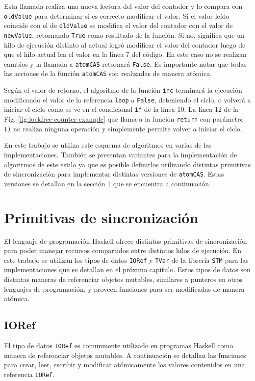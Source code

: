 Esta llamada realiza una nueva lectura del valor del contador y lo compara con \texttt{oldValue} para determinar si es correcto modificar el valor.
Si el valor leído coincide con el de \texttt{oldValue} se modifica el valor del contador con el valor de \texttt{newValue}, retornando \texttt{True} como resultado de la función.
Si no, significa que un hilo de ejecución distinto al actual logró modificar el valor del contador luego de que el hilo actual lea el valor en la línea 7 del código.
En este caso no se realizan cambios y la llamada a \texttt{atomCAS} retornará \texttt{False}.
Es importante notar que todas las acciones de la función \texttt{atomCAS} son realizadas de manera atómica.

Según el valor de retorno, el algoritmo de la función \texttt{inc} terminará la ejecución modificando el valor de la referencia \texttt{loop} a \texttt{False}, deteniendo el ciclo, o volverá a iniciar el ciclo como se ve en el condicional \texttt{if} de la línea 10.
La línea 12 de la Fig. \ref{fig:lockfree-counter-example} que llama a la función \texttt{return} con parámetro \texttt{()} no realiza ninguna operación y simplemente permite volver a iniciar el ciclo.

En este trabajo se utiliza este esquema de algoritmos en varias de las implementaciones. También se presentan variantes para la implementación de algoritmos de este estilo ya que es posible definirlos utilizando distintas primitivas de sincronización para implementar distintas versiones de \texttt{atomCAS}.
Estas versiones se detallan en la sección \ref{sec:primitives} que se encuentra a continuación.

\section{Primitivas de sincronización} \label{sec:primitives}
El lenguaje de programación Haskell ofrece distintas primitivas de sincronización para poder manejar recursos compartidos entre distintos hilos de ejecución.
En este trabajo se utilizan los tipos de datos \texttt{IORef} y \texttt{TVar} de la librería \texttt{STM} para las implementaciones que se detallan en el próximo capítulo.
Estos tipos de datos son distintas maneras de referenciar objetos mutables, similares a punteros en otros lenguajes de programación, y proveen funciones para ser modificadas de manera atómica.

\subsection{IORef}\label{sub:ioref}
El tipo de datos \texttt{IORef} es comunmente utilizado en programas Haskell como manera de referenciar objetos mutables.
A continuación se detallan las funciones para crear, leer, escribir y modificar atómicamente los valores contenidos en una referencia \texttt{IORef}.

